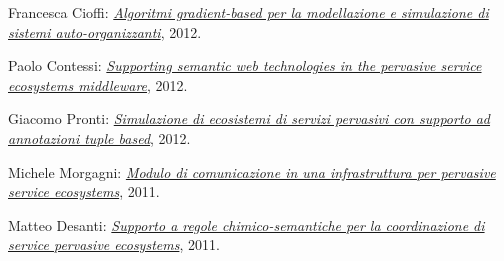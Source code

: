 \begin{innerlist}
    \item Francesca Cioffi: \href{http://amslaurea.unibo.it/4088/}{\textit{Algoritmi gradient-based per la modellazione e simulazione di sistemi auto-organizzanti}}, 2012.
    \item Paolo Contessi: \href{http://amslaurea.unibo.it/4074/}{\textit{Supporting semantic web technologies in the pervasive service ecosystems middleware}}, 2012.
    \item Giacomo Pronti: \href{http://archive.fo/nBeOg}{\textit{Simulazione di ecosistemi di servizi pervasivi con supporto ad annotazioni tuple based}}, 2012.
    \item Michele Morgagni: \href{http://archive.fo/6mnSN}{\textit{Modulo di comunicazione in una infrastruttura per pervasive service ecosystems}}, 2011.
    \item Matteo Desanti: \href{http://archive.fo/rwla1}{\textit{Supporto a regole chimico-semantiche per la coordinazione di service pervasive ecosystems}}, 2011.
\end{innerlist}

